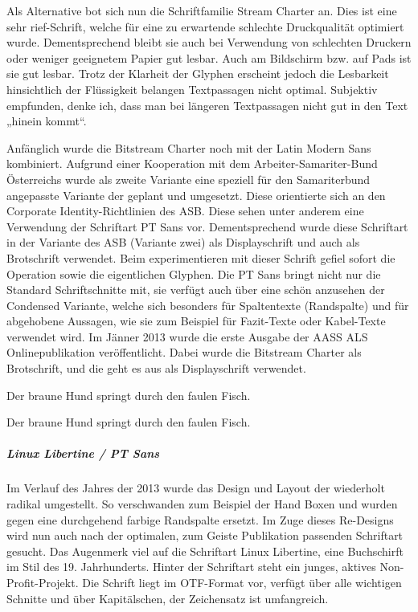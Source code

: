 \documentclass[
ngerman,
paper=a4,
asymmetric,
fontsize=10pt,
draft=false,
numbers=noenddot,
bibtotocnumbered,
footnotes=multiple,
toc=flat,
]{scrbook}
\begin{document}
{%
\selectfont
Als Alternative bot sich nun die Schriftfamilie Stream
Charter an. Dies ist eine sehr rief-Schrift, welche für eine
zu erwartende schlechte Druckqualität optimiert wurde.
Dementsprechend bleibt sie auch bei Verwendung von
schlechten Druckern oder weniger geeignetem Papier gut
lesbar. Auch am Bildschirm bzw. auf Pads ist sie gut lesbar.
Trotz der Klarheit der Glyphen erscheint jedoch die
Lesbarkeit hinsichtlich der Flüssigkeit belangen
Textpassagen nicht optimal. Subjektiv empfunden, denke ich,
dass man bei längeren Textpassagen nicht gut in den Text
„hinein kommt“.

Anfänglich wurde die Bitstream Charter noch mit der Latin
Modern Sans kombiniert. Aufgrund einer Kooperation mit dem
Arbeiter-Samariter-Bund Österreichs wurde als zweite
Variante eine speziell für den Samariterbund angepasste
Variante der {\AASS} geplant und umgesetzt. Diese
orientierte sich an den Corporate Identity-Richtlinien des ASB. Diese
sehen unter anderem eine Verwendung der Schriftart PT Sans
vor. Dementsprechend wurde diese Schriftart in der Variante
des ASB (Variante zwei) als Displayschrift und auch als
Brotschrift verwendet. Beim experimentieren mit dieser
Schrift gefiel sofort die Operation sowie die eigentlichen
Glyphen. Die PT Sans bringt nicht nur die Standard
Schriftschnitte mit, sie verfügt auch über eine schön
anzusehen der Condensed Variante, welche sich besonders für
Spaltentexte (Randspalte) und für abgehobene Aussagen, wie
sie zum Beispiel für Fazit-Texte oder Kabel-Texte verwendet
wird. Im Jänner 2013 wurde die erste Ausgabe der AASS ALS
Onlinepublikation veröffentlicht. Dabei wurde die Bitstream
Charter als Brotschrift, und die geht es aus als
Displayschrift verwendet.


{}
Der braune Hund springt durch den faulen Fisch.

{\sffamily Der braune Hund springt durch den faulen Fisch.}

}

\subparagraph{Linux Libertine / PT Sans}
Im Verlauf des Jahres der 2013 wurde das Design und Layout
der {\AASS} wiederholt radikal umgestellt. So verschwanden
zum Beispiel der Hand Boxen und wurden gegen eine durchgehend
farbige Randspalte ersetzt. Im Zuge dieses Re-Designs wird
nun auch nach der optimalen, zum Geiste Publikation
passenden Schriftart gesucht. Das Augenmerk viel auf die
Schriftart Linux Libertine, eine Buchschirft im Stil des
19. Jahrhunderts. Hinter der Schriftart steht ein junges,
aktives Non-Profit-Projekt. Die Schrift liegt im OTF-Format
vor, verfügt über alle wichtigen Schnitte und über
Kapitälschen, der Zeichensatz ist umfangreich. 
\end{document}
